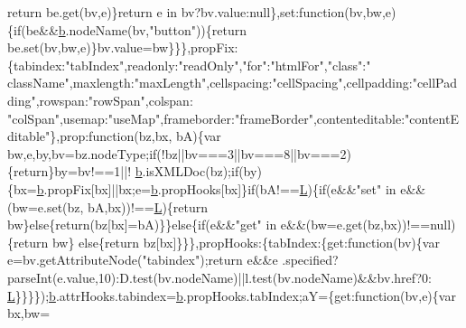 \begin{DoxyCode}
{      return} be.get(bv,e)\}\textcolor{keywordflow}{return} e in bv?bv.value:null\},set:\textcolor{keyword}{function}(bv,bw,e)\{\textcolor{keywordflow}{if}(be&&\hyperlink{docs_2_programmer's_manual_2html_2jquery_8js_aa4026ad5544b958e54ce5e106fa1c805}{b}.nodeName(bv,\textcolor{stringliteral}{"button"}))\{\textcolor{keywordflow}{return} 
      be.set(bv,bw,e)\}bv.value=bw\}\}\},propFix:\{tabindex:\textcolor{stringliteral}{"tabIndex"},readonly:\textcolor{stringliteral}{"readOnly"},\textcolor{stringliteral}{"for"}:\textcolor{stringliteral}{"htmlFor"},\textcolor{stringliteral}{"class"}:\textcolor{stringliteral}{"
      className"},maxlength:\textcolor{stringliteral}{"maxLength"},cellspacing:\textcolor{stringliteral}{"cellSpacing"},cellpadding:\textcolor{stringliteral}{"cellPadding"},rowspan:\textcolor{stringliteral}{"rowSpan"},colspan:\textcolor{stringliteral}{
      "colSpan"},usemap:\textcolor{stringliteral}{"useMap"},frameborder:\textcolor{stringliteral}{"frameBorder"},contenteditable:\textcolor{stringliteral}{"contentEditable"}\},prop:\textcolor{keyword}{function}(bz,bx,
      bA)\{var bw,e,by,bv=bz.nodeType;\textcolor{keywordflow}{if}(!bz||bv===3||bv===8||bv===2)\{\textcolor{keywordflow}{return}\}by=bv!==1||!
      \hyperlink{docs_2_programmer's_manual_2html_2jquery_8js_aa4026ad5544b958e54ce5e106fa1c805}{b}.isXMLDoc(bz);\textcolor{keywordflow}{if}(by)\{bx=\hyperlink{docs_2_programmer's_manual_2html_2jquery_8js_aa4026ad5544b958e54ce5e106fa1c805}{b}.propFix[bx]||bx;e=\hyperlink{docs_2_programmer's_manual_2html_2jquery_8js_aa4026ad5544b958e54ce5e106fa1c805}{b}.propHooks[bx]\}\textcolor{keywordflow}{if}(bA!==\hyperlink{docs_2_programmer's_manual_2html_2jquery_8js_a38ee4c0b5f4fe2a18d0c783af540d253}{L})\{\textcolor{keywordflow}{if}(e&&\textcolor{stringliteral}{"set"} in e&&(bw=e.set(bz,
      bA,bx))!==\hyperlink{docs_2_programmer's_manual_2html_2jquery_8js_a38ee4c0b5f4fe2a18d0c783af540d253}{L})\{\textcolor{keywordflow}{return} bw\}\textcolor{keywordflow}{else}\{\textcolor{keywordflow}{return}(bz[bx]=bA)\}\}\textcolor{keywordflow}{else}\{\textcolor{keywordflow}{if}(e&&\textcolor{stringliteral}{"get"} in e&&(bw=e.get(bz,bx))!==null)\{\textcolor{keywordflow}{return} bw\}\textcolor{keywordflow}{
      else}\{\textcolor{keywordflow}{return} bz[bx]\}\}\},propHooks:\{tabIndex:\{\textcolor{keyword}{get}:\textcolor{keyword}{function}(bv)\{var e=bv.getAttributeNode(\textcolor{stringliteral}{"tabindex"});\textcolor{keywordflow}{return} e&&e
      .specified?parseInt(e.value,10):D.test(bv.nodeName)||l.test(bv.nodeName)&&bv.href?0:
      \hyperlink{docs_2_programmer's_manual_2html_2jquery_8js_a38ee4c0b5f4fe2a18d0c783af540d253}{L}\}\}\}\});\hyperlink{docs_2_programmer's_manual_2html_2jquery_8js_aa4026ad5544b958e54ce5e106fa1c805}{b}.attrHooks.tabindex=\hyperlink{docs_2_programmer's_manual_2html_2jquery_8js_aa4026ad5544b958e54ce5e106fa1c805}{b}.propHooks.tabIndex;aY=\{\textcolor{keyword}{get}:\textcolor{keyword}{function}(bv,e)\{var bx,bw=

\end{DoxyCode}
